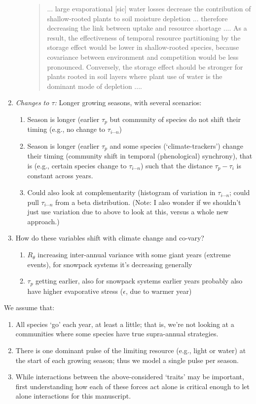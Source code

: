 \documentclass[11pt,a4paper,oneside]{article}
\begin{document}
\begin{enumerate}
\begin{enumerate}
\begin{quote}
... large evaporational [sic] water
losses decrease the contribution of shallow-rooted plants
to soil moisture depletion ... therefore decreasing the link
between uptake and resource shortage .... As
a result, the effectiveness of temporal resource partitioning
by the storage effect would be lower in shallow-rooted
species, because covariance between environment and competition would be less pronounced. Conversely, the
storage effect should be stronger for plants rooted in soil
layers where plant use of water is the dominant mode of
depletion ....
\end{quote}
\end{enumerate}
\item \emph{Changes to \(\tau\):} Longer growing seasons, with several scenarios:
\begin{enumerate}
\item Season is longer (earlier \(\tau_{p}\) but community of species
  do not shift their timing (e.g., no change to  \(\tau_{i \cdots
    n}\)) 
\item Season is longer (earlier \(\tau_{p}\) and some species (`climate-trackers') change
  their timing (community shift in temporal (phenological) synchrony),
  that is (e.g., certain species change to  \(\tau_{i \cdots
    n}\)) such that the distance \(\tau_{p}-\tau_{i}\) is constant
  across years.
\item Could also look at complementarity (histogram of variation in \(\tau_{i \cdots
    n}\); could pull \(\tau_{i \cdots
    n}\) from a beta distribution. (Note: I also wonder if we
  shouldn't just use variation due to above to look at this, versus a
  whole new approach.)
\end{enumerate}
\item How do these variables shift with climate change and co-vary?
\begin{enumerate} 
\item \(R_{\theta}\) increasing inter-annual variance with some giant
  years (extreme events), for snowpack systems it's decreasing
  generally
\item \(\tau_{p}\) getting earlier, also for snowpack systems earlier
  years probably also have higher evaporative stress (\(\epsilon\),
  due to warmer year)
\end{enumerate}
\end{enumerate}

\noindent We assume that:
\begin{enumerate}
\item All species `go' each year, at least a little; that is, we're
  not looking at a communities where some species have true
  supra-annual strategies.
\item There is one dominant pulse of the limiting resource (e.g.,
  light or water) at the
  start of each growing season; thus we model a  single pulse per
  season.
\item While interactions between the above-considered `traits' may be
  important, first understanding how each of these forces act alone is
  critical enough to let alone interactions for this manuscript.
\end{enumerate}
\end{document}
